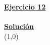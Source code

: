 \indent\underline{\textbf{Ejercicio 12}}\\
\lipsum[4]\\

\indent\underline{\textbf{Solución}}\\

\line(1,0){\textwidth}
